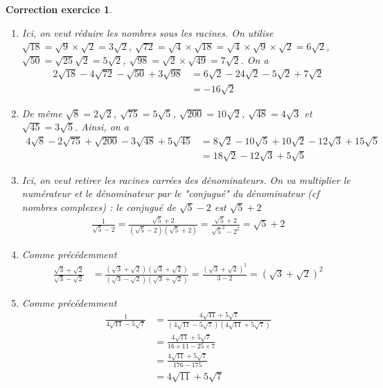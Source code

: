 \documentclass[12pt]{article}
\newtheorem{correction}{\bf Correction exercice}
\newenvironment{cor}{
\begin{correction}\smallskip\normalfont}{\end{correction}
}
\newif\ifcorrige\corrigefalse
\begin{document}
\ifcorrige
\color{magenta}
\begin{cor}
  $\qquad$
\begin{enumerate}
\item Ici, on veut r\'eduire les nombres sous les racines.
  On utilise $\sqrt{18} = \sqrt{9} \times \sqrt{2} = 3\sqrt{2}$,
  $\sqrt{72} = \sqrt{4} \times \sqrt{18} = \sqrt{4} \times \sqrt{9} \times \sqrt{2} = 6\sqrt{2}$,
  $\sqrt{50} = \sqrt{25} \sqrt{2} = 5 \sqrt{2}$,
  $\sqrt{98} = \sqrt{2} \times \sqrt{49} = 7 \sqrt{2}$.
  On a
  \begin{align*}
    2 \sqrt{18} - 4 \sqrt{72} - \sqrt{50} + 3\sqrt{98}
    &= 6 \sqrt{2} - 24 \sqrt{2} - 5 \sqrt{2} + 7 \sqrt{2}
    \\
    &= -16 \sqrt{2}
  \end{align*}
\item De m\^eme
  $\sqrt{8} = 2 \sqrt{2}$, $\sqrt{75} = 5 \sqrt{5}$, $\sqrt{200} = 10 \sqrt{2}$,
  $\sqrt{48} = 4 \sqrt{3}$ et $\sqrt{45} = 3 \sqrt{5}$.
  Ainsi, on a
  \begin{align*}
    4\sqrt{8} -2\sqrt{75} + \sqrt{200}-3\sqrt{48}+5\sqrt{45}
    &= 8 \sqrt{2} - 10 \sqrt{5} + 10 \sqrt{2} - 12 \sqrt{3} +15 \sqrt{5}
    \\
    &= 18 \sqrt{2} - 12 \sqrt{3} + 5 \sqrt{5}
  \end{align*}
\item Ici, on veut retirer les racines carr\'ees des d\'enominateurs.
  On va multiplier le num\'erateur et le d\'enominateur par le "conjugu\'e" du d\'enominateur
  (cf nombres complexes) : le conjugu\'e de $\sqrt{5}-2$ est $\sqrt{5}+2$
  \begin{align*}
    \frac1{\sqrt{5}-2}
    = \frac{\sqrt{5}+2}{(\sqrt{5}-2)(\sqrt{5}+2)}= \frac{\sqrt{5}+2}{\sqrt{5}^2-2^2}
    = \sqrt{5}+2
  \end{align*}
\item Comme pr\'ec\'edemment
  \begin{align*}
    \frac{\sqrt{3}+\sqrt{2}}{\sqrt{3}-\sqrt{2}}
    &= \frac{(\sqrt{3}+\sqrt{2})(\sqrt{3}+\sqrt{2})}{(\sqrt{3}-\sqrt{2})(\sqrt{3}+\sqrt{2})}
      = \frac{(\sqrt{3}+\sqrt{2})^2}{3-2}
      = (\sqrt{3}+\sqrt{2})^2
  \end{align*}

\item
  Comme pr\'ec\'edemment
  \begin{align*}
    \frac1{4\sqrt{11} -5\sqrt{7}}
    &= \frac{4\sqrt{11}+5\sqrt{7}}{(4\sqrt{11} -5\sqrt{7})(4\sqrt{11} +5\sqrt{7})}
    \\
    &= \frac{4\sqrt{11}+5\sqrt{7}}{16 \times 11 - 25 \times 7}
    \\
    &= \frac{4\sqrt{11}+5\sqrt{7}}{176 - 175}
    \\
    &= 4\sqrt{11}+5\sqrt{7}
  \end{align*}


\end{enumerate}
\end{cor}
\end{document}
